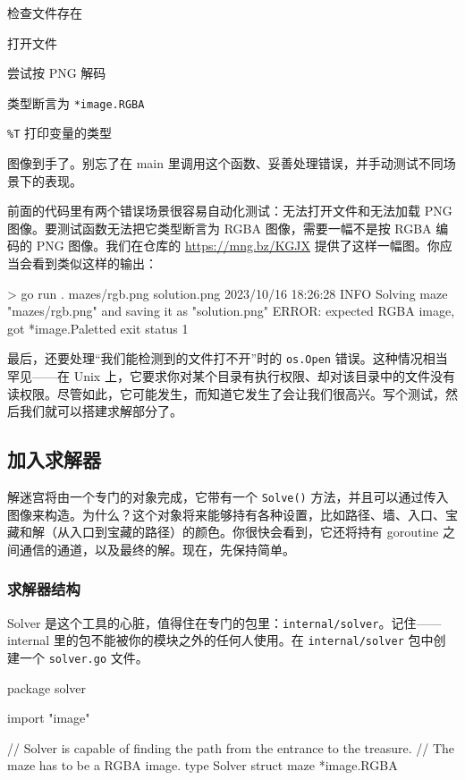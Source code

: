 \begin{codeannotations}
\item 检查文件存在
\item 打开文件
\item 尝试按 PNG 解码
\item 类型断言为 \texttt{*image.RGBA}
\item \texttt{\%T} 打印变量的类型
\end{codeannotations}

图像到手了。别忘了在 main 里调用这个函数、妥善处理错误，并手动测试不同场景下的表现。

前面的代码里有两个错误场景很容易自动化测试：无法打开文件和无法加载 PNG 图像。要测试函数无法把它类型断言为 RGBA 图像，需要一幅不是按 RGBA 编码的 PNG 图像。我们在仓库的 \url{https://mng.bz/KGJX} 提供了这样一幅图。你应当会看到类似这样的输出：

\begin{shellcode}[]
> go run . mazes/rgb.png solution.png
2023/10/16 18:26:28 INFO Solving maze "mazes/rgb.png" and saving it as
"solution.png"
ERROR: expected RGBA image, got *image.Paletted
exit status 1
\end{shellcode}

最后，还要处理``我们能检测到的文件打不开''时的 \texttt{os.Open} 错误。这种情况相当罕见——在 Unix 上，它要求你对某个目录有执行权限、却对该目录中的文件没有读权限。尽管如此，它可能发生，而知道它发生了会让我们很高兴。写个测试，然后我们就可以搭建求解部分了。

\subsection{加入求解器}

解迷宫将由一个专门的对象完成，它带有一个 \texttt{Solve()} 方法，并且可以通过传入图像来构造。为什么？这个对象将来能够持有各种设置，比如路径、墙、入口、宝藏和解（从入口到宝藏的路径）的颜色。你很快会看到，它还将持有 goroutine 之间通信的通道，以及最终的解。现在，先保持简单。

\subsubsection*{求解器结构}

Solver 是这个工具的心脏，值得住在专门的包里：\texttt{internal/solver}。记住——internal 里的包不能被你的模块之外的任何人使用。在 \texttt{internal/solver} 包中创建一个 \texttt{solver.go} 文件。

\begin{gocode}[title={代码清单 9.3 \texttt{solver.go}：\texttt{Solver} 结构}]
package solver

import "image"

// Solver is capable of finding the path from the entrance to the treasure.
// The maze has to be a RGBA image.
type Solver struct {
    maze *image.RGBA
}
\end{gocode}

